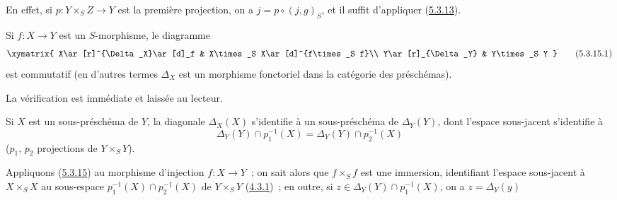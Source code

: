 En effet, si $p:Y\times_S Z\to Y$ est la première projection, on a
$j=p\circ(j,g)_S$, et il suffit d'appliquer
(\hyperref[I.5.3.13-fr]{5.3.13}).

\begin{proposition}[5.3.15]
\label{I.5.3.15-fr}
Si $f:X\to Y$ est un $S$-morphisme, le diagramme
\[
  \xymatrix{
    X\ar[r]^{\Delta_X}\ar[d]_f &
    X\times_S X\ar[d]^{f\times_S f}\\
    Y\ar[r]_{\Delta_Y} &
    Y\times_S Y
  }
  \tag{5.3.15.1}\label{I.5.3.15.1-fr}
\]
est commutatif (en d'autres termes $\Delta_X$ est un morphisme fonctoriel
dans la catégorie des préschémas).
\end{proposition}

La vérification est immédiate et laissée au lecteur.

\begin{corollary}[5.3.16]
\label{I.5.3.16-fr}
Si $X$ est un sous-préschéma de $Y$, la diagonale $\Delta_X(X)$ s'identifie à
un sous-préschéma de $\Delta_Y(Y)$, dont l'espace sous-jacent s'identifie à
\[
  \Delta_Y(Y)\cap p_1^{-1}(X)=\Delta_Y(Y)\cap p_2^{-1}(X)
\]
($p_1$, $p_2$ projections de $Y\times_S Y$).
\end{corollary}

Appliquons (\hyperref[I.5.3.15-fr]{5.3.15}) au morphisme d'injection
$f:X\to Y$~; on sait alors que $f\times_S f$ est une immersion, identifiant
l'espace sous-jacent à $X\times_S X$ au sous-espace
$p_1^{-1}(X)\cap p_2^{-1}(X)$ de $Y\times_S Y$
(\hyperref[I.4.3.1-fr]{4.3.1})~; en outre, si
$z\in\Delta_Y(Y)\cap p_1^{-1}(X)$, on a $z=\Delta_Y(y)$

